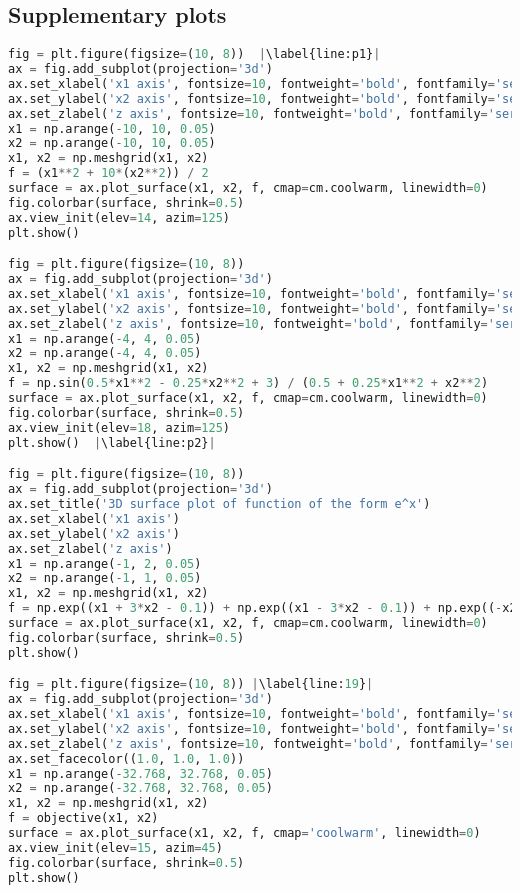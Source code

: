 \subsection{Supplementary plots}
\begin{lstlisting}[language=Python, label={lst:code5}, mathescape=true, breaklines=true, escapechar=|]
fig = plt.figure(figsize=(10, 8))  |\label{line:p1}|
ax = fig.add_subplot(projection='3d')
ax.set_xlabel('x1 axis', fontsize=10, fontweight='bold', fontfamily='serif')
ax.set_ylabel('x2 axis', fontsize=10, fontweight='bold', fontfamily='serif')
ax.set_zlabel('z axis', fontsize=10, fontweight='bold', fontfamily='serif')
x1 = np.arange(-10, 10, 0.05)
x2 = np.arange(-10, 10, 0.05)
x1, x2 = np.meshgrid(x1, x2)
f = (x1**2 + 10*(x2**2)) / 2
surface = ax.plot_surface(x1, x2, f, cmap=cm.coolwarm, linewidth=0)
fig.colorbar(surface, shrink=0.5)
ax.view_init(elev=14, azim=125)
plt.show()

fig = plt.figure(figsize=(10, 8))
ax = fig.add_subplot(projection='3d')
ax.set_xlabel('x1 axis', fontsize=10, fontweight='bold', fontfamily='serif')
ax.set_ylabel('x2 axis', fontsize=10, fontweight='bold', fontfamily='serif')
ax.set_zlabel('z axis', fontsize=10, fontweight='bold', fontfamily='serif')
x1 = np.arange(-4, 4, 0.05)
x2 = np.arange(-4, 4, 0.05)
x1, x2 = np.meshgrid(x1, x2)
f = np.sin(0.5*x1**2 - 0.25*x2**2 + 3) / (0.5 + 0.25*x1**2 + x2**2)
surface = ax.plot_surface(x1, x2, f, cmap=cm.coolwarm, linewidth=0)
fig.colorbar(surface, shrink=0.5)
ax.view_init(elev=18, azim=125)
plt.show()  |\label{line:p2}|

fig = plt.figure(figsize=(10, 8))
ax = fig.add_subplot(projection='3d')
ax.set_title('3D surface plot of function of the form e^x')
ax.set_xlabel('x1 axis')
ax.set_ylabel('x2 axis')
ax.set_zlabel('z axis')
x1 = np.arange(-1, 2, 0.05)
x2 = np.arange(-1, 1, 0.05)
x1, x2 = np.meshgrid(x1, x2)
f = np.exp((x1 + 3*x2 - 0.1)) + np.exp((x1 - 3*x2 - 0.1)) + np.exp((-x2 - 0.1))
surface = ax.plot_surface(x1, x2, f, cmap=cm.coolwarm, linewidth=0)
fig.colorbar(surface, shrink=0.5)
plt.show()

fig = plt.figure(figsize=(10, 8)) |\label{line:19}|
ax = fig.add_subplot(projection='3d')
ax.set_xlabel('x1 axis', fontsize=10, fontweight='bold', fontfamily='serif')
ax.set_ylabel('x2 axis', fontsize=10, fontweight='bold', fontfamily='serif')
ax.set_zlabel('z axis', fontsize=10, fontweight='bold', fontfamily='serif')
ax.set_facecolor((1.0, 1.0, 1.0))
x1 = np.arange(-32.768, 32.768, 0.05)
x2 = np.arange(-32.768, 32.768, 0.05)
x1, x2 = np.meshgrid(x1, x2)
f = objective(x1, x2)
surface = ax.plot_surface(x1, x2, f, cmap='coolwarm', linewidth=0)
ax.view_init(elev=15, azim=45)
fig.colorbar(surface, shrink=0.5)
plt.show()


\end{lstlisting}
